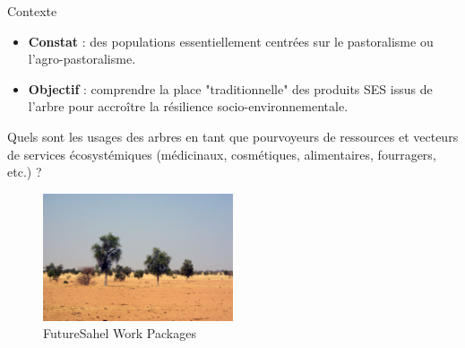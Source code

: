 \documentclass[newPxFont]{beamer}
\begin{document}
\begin{frame}[c]{Contexte}
\vspace{-1cm}
\begin{itemize}
  \item \textbf{Constat} : des populations essentiellement centrées sur le pastoralisme ou l'agro-pastoralisme.
  \item \textbf{Objectif} : comprendre la place "traditionnelle" des produits SES issus de l'arbre pour accroître la résilience socio-environnementale.
\end{itemize}

Quels sont les usages des arbres en tant que pourvoyeurs de ressources et vecteurs de services écosystémiques (médicinaux, cosmétiques, alimentaires, fourragers, etc.) ?

\begin{figure}
	\centering
	\includegraphics[width = 0.5\textwidth]{img/2007_Podor.JPG}
	\caption{FutureSahel Work Packages}
\end{figure}
\end{frame}
\end{document}
